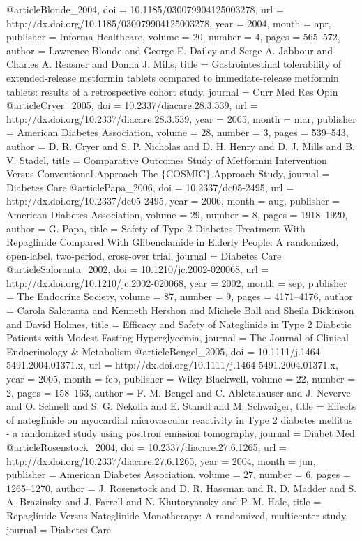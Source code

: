 @article{Blonde_2004,
	doi = {10.1185/030079904125003278},
	url = {http://dx.doi.org/10.1185/030079904125003278},
	year = 2004,
	month = {apr},
	publisher = {Informa Healthcare},
	volume = {20},
	number = {4},
	pages = {565--572},
	author = {Lawrence Blonde and George E. Dailey and Serge A. Jabbour and Charles A. Reasner and Donna J. Mills},
	title = {Gastrointestinal tolerability of extended-release metformin tablets compared to immediate-release metformin tablets: results of a retrospective cohort study},
	journal = {Curr Med Res Opin}
}
@article{Cryer_2005,
	doi = {10.2337/diacare.28.3.539},
	url = {http://dx.doi.org/10.2337/diacare.28.3.539},
	year = 2005,
	month = {mar},
	publisher = {American Diabetes Association},
	volume = {28},
	number = {3},
	pages = {539--543},
	author = {D. R. Cryer and S. P. Nicholas and D. H. Henry and D. J. Mills and B. V. Stadel},
	title = {Comparative Outcomes Study of Metformin Intervention Versus Conventional Approach The $\lbrace$COSMIC$\rbrace$ Approach Study},
	journal = {Diabetes Care}
}
@article{Papa_2006,
	doi = {10.2337/dc05-2495},
	url = {http://dx.doi.org/10.2337/dc05-2495},
	year = 2006,
	month = {aug},
	publisher = {American Diabetes Association},
	volume = {29},
	number = {8},
	pages = {1918--1920},
	author = {G. Papa},
	title = {Safety of Type 2 Diabetes Treatment With Repaglinide Compared With Glibenclamide in Elderly People: A randomized, open-label, two-period, cross-over trial},
	journal = {Diabetes Care}
}
@article{Saloranta_2002,
	doi = {10.1210/jc.2002-020068},
	url = {http://dx.doi.org/10.1210/jc.2002-020068},
	year = 2002,
	month = {sep},
	publisher = {The Endocrine Society},
	volume = {87},
	number = {9},
	pages = {4171--4176},
	author = {Carola Saloranta and Kenneth Hershon and Michele Ball and Sheila Dickinson and David Holmes},
	title = {Efficacy and Safety of Nateglinide in Type 2 Diabetic Patients with Modest Fasting Hyperglycemia},
	journal = {The Journal of Clinical Endocrinology {\&} Metabolism}
}
@article{Bengel_2005,
	doi = {10.1111/j.1464-5491.2004.01371.x},
	url = {http://dx.doi.org/10.1111/j.1464-5491.2004.01371.x},
	year = 2005,
	month = {feb},
	publisher = {Wiley-Blackwell},
	volume = {22},
	number = {2},
	pages = {158--163},
	author = {F. M. Bengel and C. Abletshauser and J. Neverve and O. Schnell and S. G. Nekolla and E. Standl and M. Schwaiger},
	title = {Effects of nateglinide on myocardial microvascular reactivity in Type 2 diabetes mellitus - a randomized study using positron emission tomography},
	journal = {Diabet Med}
}
@article{Rosenstock_2004,
	doi = {10.2337/diacare.27.6.1265},
	url = {http://dx.doi.org/10.2337/diacare.27.6.1265},
	year = 2004,
	month = {jun},
	publisher = {American Diabetes Association},
	volume = {27},
	number = {6},
	pages = {1265--1270},
	author = {J. Rosenstock and D. R. Hassman and R. D. Madder and S. A. Brazinsky and J. Farrell and N. Khutoryansky and P. M. Hale},
	title = {Repaglinide Versus Nateglinide Monotherapy: A randomized, multicenter study},
	journal = {Diabetes Care}
}
